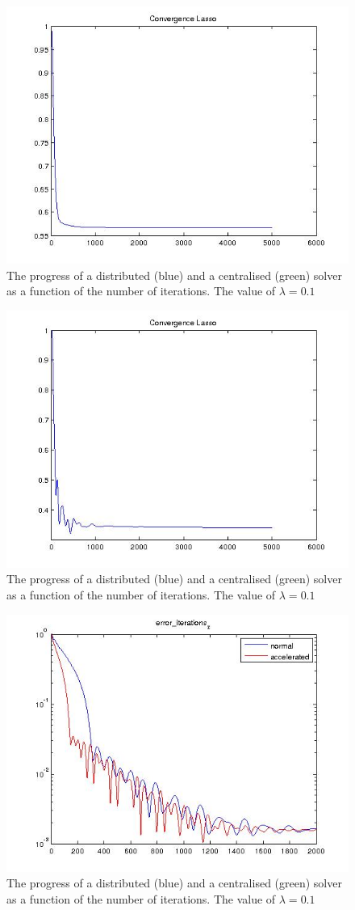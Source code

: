 \documentclass{article}
\begin{document}
\begin{figure}[h]
\centering
\includegraphics[height = 7.3 cm]{steps_difference.jpg}
\caption{The progress of a distributed (blue) and a centralised (green) solver as a function of the number of iterations. The value of \(\lambda = 0.1\)}
\label{fig:steps_difference}
\end{figure}

\begin{figure}[h]
\centering
\includegraphics[height = 7.3 cm]{steps_splines.jpg}
\caption{The progress of a distributed (blue) and a centralised (green) solver as a function of the number of iterations. The value of \(\lambda = 0.1\)}
\label{fig:steps_splines}
\end{figure}

\begin{figure}[h]
\centering
\includegraphics[height = 7.3 cm]{normalvsaccel.jpg}
\caption{The progress of a distributed (blue) and a centralised (green) solver as a function of the number of iterations. The value of \(\lambda = 0.1\)}
\label{fig:steps_splines}
\end{figure}
\end{document}
